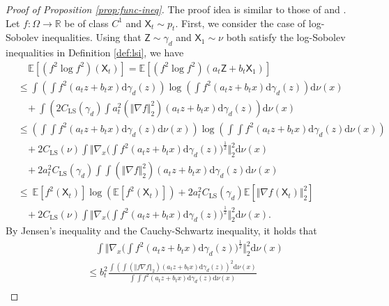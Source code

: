 \documentclass[twoside,11pt]{article}
\def\sR{{\mathbb{R}}}
\newcommand{\E}{\mathbb{E}}
\newcommand{\diff}{\mathrm{d}}
\numberwithin{equation}{section}
\begin{document}
\begin{proof} [Proof of Proposition \ref{prop:func-ineq}]
    The proof idea is similar to those of \cite[Proposition 1]{ball2003entropy} and \cite[Proposition 18]{cattiaux2014semi}.
    Let $f: \Omega \to \sR$ be of class $C^1$ and $\mathsf{X}_t \sim p_t$.
    First, we consider the case of log-Sobolev inequalities.
    Using that $\mathsf{Z} \sim \gamma_d$ and $\mathsf{X}_1 \sim \nu$ both satisfy the log-Sobolev inequalities in Definition \ref{def:lsi}, we have
    \begin{align*}
        &~~~~~ \E [(f^2 \log f^2) (\mathsf{X}_t)]
        = \E [(f^2 \log f^2) (a_t \mathsf{Z} + b_t \mathsf{X}_1)] \\
        &\le \int \left( \int f^2(a_t z + b_t x) \diff \gamma_d(z) \right) \log \left( \int f^2(a_t z + b_t x) \diff \gamma_d(z) \right) \diff \nu(x) \\
        &~~~~ + \int \left( 2 C_{\mathrm{LS}}(\gamma_d) \int a_t^2 (\Vert \nabla f \Vert_2^2) (a_t z + b_t x) \diff \gamma_d(z) \right) \diff \nu(x) \\
        & \le \left( \int \int f^2(a_t z + b_t x) \diff \gamma_d(z) \diff \nu(x) \right) \log \left( \int \int f^2(a_t z + b_t x) \diff \gamma_d(z) \diff \nu(x) \right) \\
        &~~~~ + 2 C_{\mathrm{LS}}(\nu) \int \Big\Vert \nabla_x \Big(\int f^2(a_t z + b_t x) \diff \gamma_d(z) \Big)^{\frac12} \Big\Vert_2^2 \diff \nu(x) \\
        &~~~~ + 2 a_t^2 C_{\mathrm{LS}}(\gamma_d) \int \int (\Vert \nabla f \Vert_2^2) (a_t z + b_t x) \diff \gamma_d(z) \diff \nu(x) \\
        & \le ~ \E [f^2 (\mathsf{X}_t)] \log \left( \E [f^2 (\mathsf{X}_t)] \right)
        + 2 a_t^2 C_{\mathrm{LS}}(\gamma_d) \E[\Vert \nabla f(\mathsf{X}_t) \Vert_2^2] \\
        &~~~~ + 2 C_{\mathrm{LS}}(\nu) \int \Big\Vert \nabla_x \Big(\int f^2(a_t z + b_t x) \diff \gamma_d(z) \Big)^{\frac12} \Big\Vert_2^2 \diff \nu(x).
    \end{align*}
    By Jensen's inequality and the Cauchy-Schwartz inequality, it holds that
    \begin{align*}
        &~~~~ \int \Big\Vert \nabla_x \Big(\int f^2(a_t z + b_t x) \diff \gamma_d(z) \Big)^{\frac12} \Big\Vert_2^2 \diff \nu(x) \\
        & \le b_t^2 \frac{\int \left( \int (\Vert f \nabla f \Vert_2) (a_t z + b_t x) \diff \gamma_d(z) \right)^2 \diff \nu(x)}
          {\int \int f^2(a_t z + b_t x) \diff \gamma_d(z) \diff \nu(x)} \\

\end{align*}
\end{proof}
\end{document}
